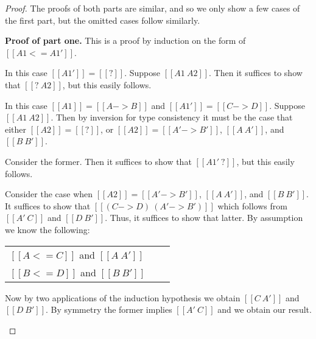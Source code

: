 \begin{proof}
  
The proofs of both parts are similar, and so we only show a few
cases of the first part, but the omitted cases follow similarly.

\noindent
\textbf{Proof of part one.} This is a proof by induction on the form
of $[[A1 <= A1']]$.
\begin{description}
\item

  \noindent
  In this case $[[A1']] = [[?]]$.  Suppose $[[A1 ~ A2]]$.  Then
  it suffices to show that $[[? ~ A2]]$, but this easily follows.
  
\item[]
\item

  \noindent
  In this case $[[A1]] = [[A -> B]]$ and $[[A1']] = [[C -> D]]$.  Suppose
  $[[A1 ~ A2]]$.  Then by inversion for type consistency it must
  be the case that either $[[A2]] = [[?]]$, or
  $[[A2]] = [[A' -> B']]$, $[[A ~ A']]$, and $[[B ~ B']]$.
  
  Consider the former.  Then it suffices to show that $[[A1' ~ ?]]$,
  but this easily follows.

  Consider the case when $[[A2]] = [[A' -> B']]$, $[[A ~ A']]$, and $[[B ~ B']]$.
  It suffices to show that $[[(C -> D) ~ (A' -> B')]]$ which follows from
  $[[A' ~ C]]$ and $[[D ~ B']]$.  Thus, it suffices to show that latter.
  By assumption we know the following:
  \begin{center}
    \begin{tabular}{lll}
      $[[A <= C]]$ and $[[A ~ A']]$\\
      $[[B <= D]]$ and $[[B ~ B']]$
    \end{tabular}
  \end{center}
  Now by two applications of the induction hypothesis we obtain $[[C ~ A']]$
  and $[[D ~ B']]$. By symmetry the former implies $[[A' ~ C]]$ and
  we obtain our result.
\end{description}  
\end{proof}

